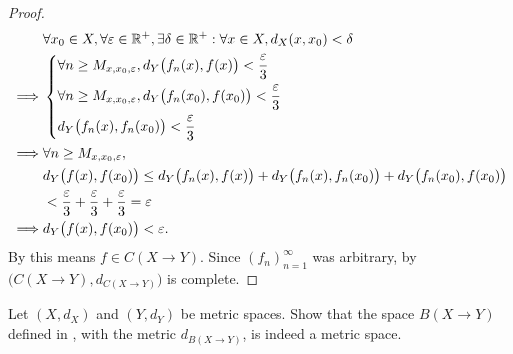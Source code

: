 \begin{proof}
  \begin{align*}
             & \forall x_0 \in X, \forall \varepsilon \in \mathbb{R}^+, \exists \delta \in \mathbb{R}^+ : \forall x \in X, d_X(x, x_0) < \delta         \\
    \implies & \begin{dcases}
                 \forall n \geq M_{x, x_0, \varepsilon}, d_Y\big(f_n(x), f(x)\big) < \dfrac{\varepsilon}{3}     \\
                 \forall n \geq M_{x, x_0, \varepsilon}, d_Y\big(f_n(x_0), f(x_0)\big) < \dfrac{\varepsilon}{3} \\
                 d_Y\big(f_n(x), f_n(x_0)\big) < \dfrac{\varepsilon}{3}
               \end{dcases}                           \\
    \implies & \forall n \geq M_{x, x_0, \varepsilon},                                                                                  \\
             & d_Y\big(f(x), f(x_0)\big) \leq d_Y\big(f_n(x), f(x)\big) + d_Y\big(f_n(x), f_n(x_0)\big) + d_Y\big(f_n(x_0), f(x_0)\big) \\
             & < \dfrac{\varepsilon}{3} + \dfrac{\varepsilon}{3} + \dfrac{\varepsilon}{3} = \varepsilon                                 \\
    \implies & d_Y\big(f(x), f(x_0)\big) < \varepsilon.
  \end{align*}
  By  this means \(f \in C(X \to Y)\).
  Since \((f_n)_{n = 1}^\infty\) was arbitrary, by  \(\big(C(X \to Y), d_{C(X \to Y)}\big)\) is complete.
\end{proof}

\exercisesection

\begin{ex}\label{ii:ex:3.4.1}
  Let \((X, d_X)\) and \((Y, d_Y)\) be metric spaces.
  Show that the space \(B(X \to Y)\) defined in , with the metric \(d_{B(X \to Y)}\), is indeed a metric space.
\end{ex}

